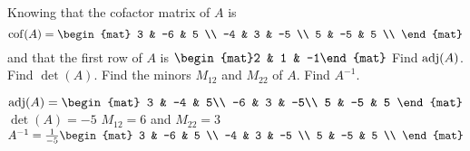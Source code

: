 
\begin{Exercise}[
name={},
title={}, 
difficulty=0,
origin={\cite{MB}}]
Knowing that the cofactor matrix of $A$ is
\[
\cof(A)=
\begin{mat}
  3 & -6 & 5 \\
  -4 & 3 & -5 \\
  5 & -5 & 5 \\
\end{mat}
\] and that the first row of $A$ is $\begin{mat}2 & 1 & -1\end{mat}$
\Question Find $\operatorname{adj}(A)$.
\Question Find $\det(A)$.
\Question Find the minors $M_{12}$ and $M_{22}$ of $A$.
\Question Find $A^{-1}$.
\end{Exercise}

\begin{Answer}
\Question $\adj(A) =
\begin{mat}
3 & -4 & 5\\
-6 & 3 & -5\\
5 & -5 & 5
\end{mat}$
\Question $\det(A) = -5$
\Question $M_{12}=6$ and $M_{22}=3$
\Question $A^{-1}=\frac{1}{-5}
\begin{mat}
  3 & -6 & 5 \\
  -4 & 3 & -5 \\
  5 & -5 & 5 \\
\end{mat}$
\end{Answer}
